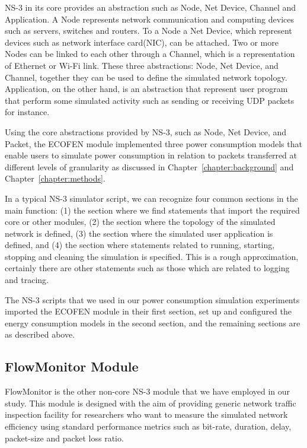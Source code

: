 NS-3 in its core provides an abstraction such as Node, Net Device, Channel and Application. A Node represents  network communication and computing devices such as servers, switches and routers. To a Node a Net Device, which represent devices such as network interface card(NIC), can be attached. Two or more Nodes can be linked to each other through a Channel, which is a representation of Ethernet or Wi-Fi link. These three abstractions: Node, Net Device, and Channel, together they can be used to define the simulated network topology. Application, on the other hand, is an abstraction that represent user program that perform some simulated activity such as sending or receiving UDP packets for instance\cite{ns3}. 

Using the core abstractions provided by NS-3, such as  Node, Net Device, and Packet, the ECOFEN module implemented three power consumption models that enable users to simulate power consumption in relation to packets transferred at different levels of granularity as discussed in Chapter~\ref{chapter:background} and Chapter~\ref{chapter:methods}.

In a typical NS-3 simulator script, we can recognize four common sections in the main function: (1) the section where we find statements that import the required core or other modules, (2) the section where the topology of the simulated network is defined, (3) the section where the simulated user application is defined, and (4) the section where statements related to running, starting, stopping and cleaning the simulation is specified. This is a rough approximation, certainly there are other statements such as those which are related to logging and tracing. 

The NS-3 scripts that we used in our power consumption simulation experiments imported the ECOFEN module in their first section, set up and configured the energy consumption models in the second section, and the remaining sections are as described above. 


\subsection{FlowMonitor Module}
FlowMonitor is the other non-core NS-3 module that we have employed in our study. This module is designed with the aim of providing generic network traffic inspection facility for researchers who want to measure the simulated network efficiency using standard performance metrics such as bit-rate, duration, delay, packet-size and packet loss ratio\cite{DBLP:conf/valuetools/CarneiroFR09}.  

